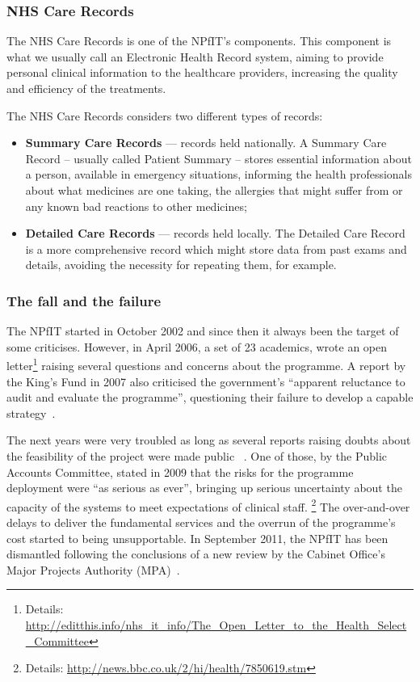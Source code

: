 \subsubsection{NHS Care Records}
The NHS Care Records is one of the NPfIT's components. This component is what we usually call an Electronic Health Record system, aiming to provide personal clinical information to the healthcare providers, increasing the quality and efficiency of the treatments.

The NHS Care Records considers two different types of records:
\begin{itemize}
\item \textbf{Summary Care Records} --- records held nationally. A Summary Care Record -- usually called Patient Summary -- stores essential information about a person, available in emergency situations, informing the health professionals about what medicines are one taking, the allergies that might suffer from or any known bad reactions to other medicines;
\item \textbf{Detailed Care Records} --- records held locally. The Detailed Care Record is a more comprehensive record which might store data from past exams and details, avoiding the necessity for repeating them, for example.
\end{itemize} 


\subsubsection{The fall and the failure}
The NPfIT started in October 2002 and since then it always been the target of some criticises. However, in April 2006, a set of 23 academics, wrote an open letter\footnote{Details: \url{http://editthis.info/nhs_it_info/The_Open_Letter_to_the_Health_Select_Committee}} raising several questions and concerns about the programme. A report by the King's Fund in 2007 also criticised the government's ``apparent reluctance to audit and evaluate the programme'', questioning their failure to develop a capable strategy~\citep{Wanless2007}.

The next years were very troubled as long as several reports raising doubts about the feasibility of the project were made public ~\citep{Powell2004,Coiera2007,Brennan2007,Clegg2007,Brennan2009}. One of those, by the Public Accounts Committee, stated in 2009 that the risks for the programme deployment were ``as serious as ever'', bringing up serious uncertainty about the capacity of the systems to meet expectations of clinical staff. \footnote{Details: \url{http://news.bbc.co.uk/2/hi/health/7850619.stm}} The over-and-over delays to deliver the fundamental services and the overrun of the programme's cost started to being unsupportable. In September 2011, the NPfIT has been dismantled following the conclusions of a new review by the Cabinet Office's Major Projects Authority (MPA)~\citep{OfHealth}.

